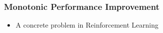 \documentclass[aspectratio=169]{beamer}
\begin{document}
\begin{frame}
\frametitle{Monotonic Performance Improvement}
\begin{overlayarea}{\textwidth}{\textheight}
\begin{itemize}
	\item A concrete problem in Reinforcement Learning
\end{itemize}
\vspace{-.25cm}
\centering
{}
\end{overlayarea}
\end{frame}
\end{document}
